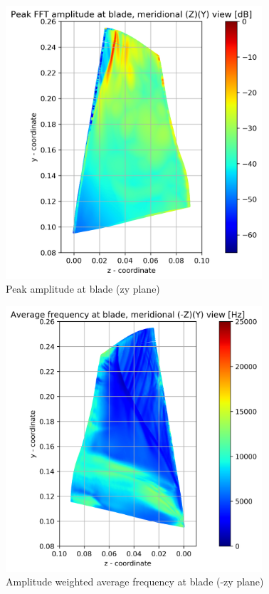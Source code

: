 \begin{figure}[ht]
	\centering
	\includegraphics[width=0.85\textwidth]{Figures/blade-zy-peak-mag.png}
	\caption{Peak amplitude at blade (zy plane)} \label{blade-zy-peak-mag}
\end{figure}
\begin{figure}[ht]
	\centering
	\includegraphics[width=0.85\textwidth]{Figures/blade-negzy-awaf.png}
    \caption{Amplitude weighted average frequency at blade (-zy plane)} \label{blade-negzy-awaf}
\end{figure}	

